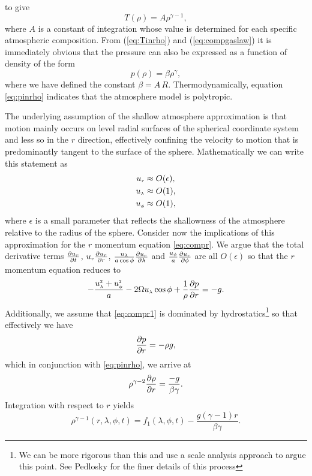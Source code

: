 to give
\begin{equation}
T(\rho)=A\rho^{\gamma-1}, \label{eq:Tinrho}
\end{equation}
where $A$ is a constant of integration whose value is determined for each specific atmospheric composition. From (\ref{eq:Tinrho}) and (\ref{eq:compgaslaw}) it is immediately obvious that the pressure can also be expressed as a function of density of the form
\begin{equation}
p(\rho)=\beta\rho^{\gamma}, \label{eq:pinrho}
\end{equation}
where we have defined the constant $\beta=A \,R$. Thermodynamically, equation \eqref{eq:pinrho} indicates that the atmosphere model is polytropic.

The underlying assumption of the shallow atmosphere approximation is that motion mainly occurs on level radial surfaces of the spherical coordinate system and less so in the $r$ direction, effectively confining the velocity to motion that is predominantly tangent to the surface of the sphere. Mathematically we can write this statement as
\begin{align}
{\ensuremath{u_{\scriptscriptstyle r}}} &\approx O(\epsilon), \label{eq:urapproxcom}\\
{u_{\scriptscriptstyle \lambda}} &\approx O(1), \\
{u_{\scriptscriptstyle \phi}} &\approx O(1), \label{eq:uphiapproxcom}
\end{align}
where $\epsilon$ is a small parameter that reflects the shallowness of the atmosphere relative to the radius of the sphere. Consider now the implications of this approximation for the $r$ momentum equation \eqref{eq:compr}. We argue that the total derivative terms ${\frac{\partial {\ensuremath{u_{\scriptscriptstyle r}}}}{\partial t}}$, ${u_{\scriptscriptstyle r}}{\frac{\partial {\ensuremath{u_{\scriptscriptstyle r}}}}{\partial r}}$, $\frac{{u_{\scriptscriptstyle \lambda}}}{a\cos\phi}{\frac{\partial {\ensuremath{u_{\scriptscriptstyle r}}}}{\partial \lambda}}$ and $\frac{{u_{\scriptscriptstyle \phi}}}{a}{\frac{\partial {\ensuremath{u_{\scriptscriptstyle r}}}}{\partial \phi}}$ are all $O(\epsilon)$ so that the $r$ momentum equation reduces to 
\begin{equation}
-\frac{{u^{\scriptscriptstyle 2}_{\scriptscriptstyle \lambda}}+{u^{\scriptscriptstyle 2}_{\scriptscriptstyle \phi}}}{a}-2\Omega{\ensuremath{u_{\scriptscriptstyle \lambda}}}\cos\phi+\frac{1}{\rho}{\frac{\partial p}{\partial r}}= -g. \label{eq:compr1}
\end{equation}
Additionally, we assume that \eqref{eq:compr1} is dominated by hydrostatics\footnote{We can be more rigorous than this and use a scale analysis approach to argue this point. See Pedlosky\cite[page 60]{Pedlosky:GFD} for the finer details of this process} so that effectively we have
\begin{equation}
{\ensuremath{\frac{\partial p}{\partial r}}}= -\rho g ,\label{eq:compr2}
\end{equation}
which in conjunction with \eqref{eq:pinrho}, we arrive at
\begin{equation*}
\rho^{\gamma-2}{\frac{\partial \rho}{\partial r}} = \frac{-g}{\beta \gamma}.
\end{equation*}
Integration with respect to $r$ yields
\begin{equation*}
\rho^{\gamma-1}(r,\lambda,\phi,t)= f_1(\lambda,\phi,t)-\frac{g(\gamma-1)r}{\beta \gamma}.
\end{equation*}

